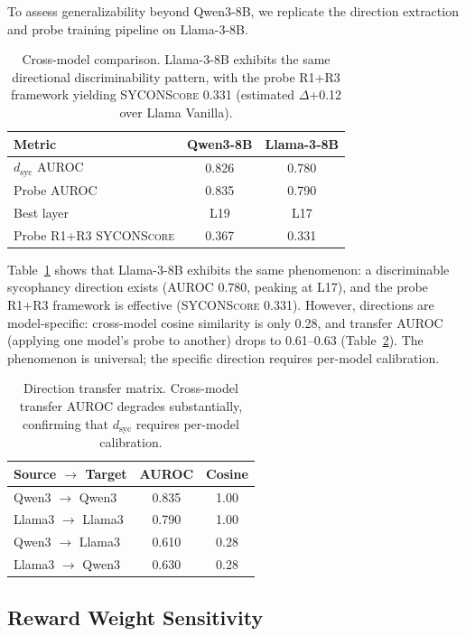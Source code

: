 \documentclass[11pt,a4paper]{article}
\newcommand{\dsyc}{d_{\text{syc}}}
\newcommand{\sycon}{\textsc{SYCONScore}}
\begin{document}
To assess generalizability beyond Qwen3-8B, we replicate the direction extraction and probe training pipeline on Llama-3-8B.

\begin{table}[t]
\centering
\small
\begin{tabular}{@{}lcc@{}}
\toprule
Metric & Qwen3-8B & Llama-3-8B \\
\midrule
$\dsyc$ AUROC & 0.826 & 0.780 \\
Probe AUROC & 0.835 & 0.790 \\
Best layer & L19 & L17 \\
Probe R1+R3 \sycon{} & 0.367 & 0.331 \\
\bottomrule
\end{tabular}
\caption{Cross-model comparison. Llama-3-8B exhibits the same directional discriminability pattern, with the probe R1+R3 framework yielding \sycon{} 0.331 (estimated $\Delta$+0.12 over Llama Vanilla).}
\label{tab:cross}
\end{table}

Table~\ref{tab:cross} shows that Llama-3-8B exhibits the same phenomenon: a discriminable sycophancy direction exists (AUROC 0.780, peaking at L17), and the probe R1+R3 framework is effective (\sycon{} 0.331). However, directions are model-specific: cross-model cosine similarity is only 0.28, and transfer AUROC (applying one model's probe to another) drops to 0.61--0.63 (Table~\ref{tab:transfer}). The phenomenon is universal; the specific direction requires per-model calibration.

\begin{table}[t]
\centering
\small
\begin{tabular}{@{}lcc@{}}
\toprule
Source $\to$ Target & AUROC & Cosine \\
\midrule
Qwen3 $\to$ Qwen3 & 0.835 & 1.00 \\
Llama3 $\to$ Llama3 & 0.790 & 1.00 \\
Qwen3 $\to$ Llama3 & 0.610 & 0.28 \\
Llama3 $\to$ Qwen3 & 0.630 & 0.28 \\
\bottomrule
\end{tabular}
\caption{Direction transfer matrix. Cross-model transfer AUROC degrades substantially, confirming that $\dsyc$ requires per-model calibration.}
\label{tab:transfer}
\end{table}


\subsection{Reward Weight Sensitivity}
\end{document}
